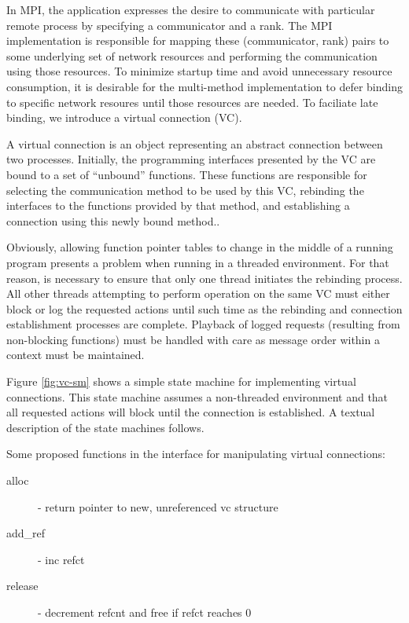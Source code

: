 \documentclass[11pt,letterpaper]{article}
\begin{document}

In MPI, the application expresses the desire to communicate with particular
remote process by specifying a communicator and a rank.  The MPI implementation
is responsible for mapping these (communicator, rank) pairs to some underlying
set of network resources and performing the communication using those
resources.  To minimize startup time and avoid unnecessary resource
consumption, it is desirable for the multi-method implementation to defer
binding to specific network resoures until those resources are needed.  To
faciliate late binding, we introduce a virtual connection (VC).

A virtual connection is an object representing an abstract connection between
two processes.  Initially, the programming interfaces presented by the VC are
bound to a set of ``unbound'' functions.  These functions are responsible for
selecting the communication method to be used by this VC, rebinding the
interfaces to the functions provided by that method, and establishing a
connection using this newly bound method..

Obviously, allowing function pointer tables to change in the middle of a
running program presents a problem when running in a threaded environment.  For
that reason, is necessary to ensure that only one thread initiates the
rebinding process.  All other threads attempting to perform operation on the
same VC must either block or log the requested actions until such time as the
rebinding and connection establishment processes are complete.  Playback of
logged requests (resulting from non-blocking functions) must be handled with
care as message order within a context must be maintained.

Figure \ref{fig:vc-sm} shows a simple state machine for implementing virtual
connections.  This state machine assumes a non-threaded environment and that
all requested actions will block until the connection is established.  A
textual description of the state machines follows.



Some proposed functions in the interface for manipulating virtual connections:
\begin{description}
\item[alloc] - return pointer to new, unreferenced vc structure
\item[add\_ref] - inc refct
\item[release] - decrement refcnt and free if refct reaches 0
\end{description}
\end{document}
